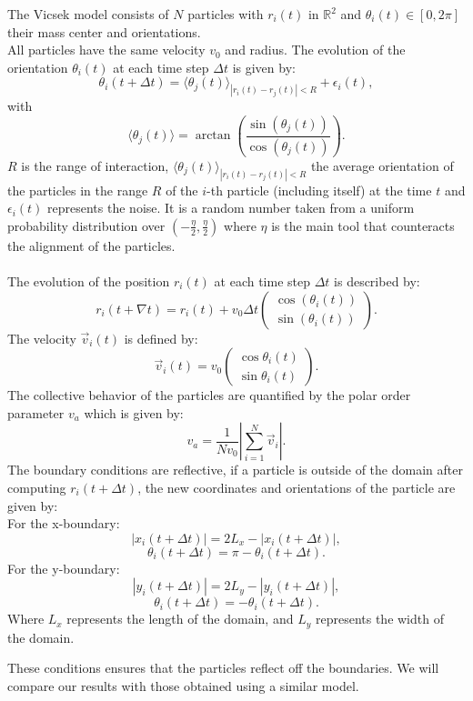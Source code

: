 \documentclass{article}
\begin{document}
The Vicsek model consists of $N$ particles with $r_i(t)$ in $\mathbb{R}^2$ and $\theta_i(t) \in \left[0, 2\pi\right]$ 
their mass center and orientations.\\
All particles have the same velocity $v_0$ and radius.
The evolution of the orientation $\theta_i(t)$ at each time step $\Delta t$ is given by:
$$\theta_i(t + \Delta t) = \langle\theta_j(t)\rangle_{|r_i(t) - r_j(t)| < R} + \epsilon_i(t),$$
with
$$\langle\theta_j(t)\rangle = \arctan\left(\frac{\sin(\theta_j(t))}{\cos(\theta_j(t))}\right).$$
$R$ is the range of interaction, $\langle\theta_j(t)\rangle_{|r_i(t) - r_j(t)| < R}$ the average 
orientation of the particles in the range $R$ of
 the $i$-th particle (including itself) at the time $t$ and $\epsilon_i(t)$ represents the noise. 
 It is a random number taken from a uniform probability distribution
over $\left(-\frac{\eta}{2}, \frac{\eta}{2}\right)$ where $\eta$ is the main tool that counteracts the alignment of the particles.\\
\\
The evolution of the position $r_i(t)$ at each time step $\Delta t$ is described by:
$$ r_i(t + \nabla t) = r_i(t) + v_0\Delta t \begin{pmatrix}
    \cos(\theta_i(t))\\
    \sin(\theta_i(t))
\end{pmatrix}.$$
The velocity $\vec{v}_i(t)$ is defined by:
$$\vec{v}_i(t) = v_0\begin{pmatrix}
    \cos\theta_i(t)\\
    \sin\theta_i(t)
\end{pmatrix}.$$
The collective behavior of the particles are quantified by the polar order parameter $v_a$ which is given by:
$$v_a = \frac{1}{Nv_0}\left|\sum^{N}_{i=1}\vec{v}_i\right|.$$
The boundary conditions are reflective, if a particle is outside of the domain after computing $r_i(t + \Delta t)$, the new 
coordinates and orientations of the particle are given by:\\
For the x-boundary:
$$|x_i(t + \Delta t)| = 2L_x - |x_i(t + \Delta t)|,$$
$$\theta_{i}(t + \Delta t) = \pi - \theta_i(t + \Delta t).$$
For the y-boundary:
$$|y_i(t + \Delta t)| = 2L_y - |y_i(t + \Delta t)|,$$
$$\theta_i(t + \Delta t) = -\theta_i(t + \Delta t).$$
Where $L_x$ represents the length of the domain, and $L_y$ represents the width of the domain.
\begin{center}
\end{center}
These conditions ensures that the particles reflect off the boundaries.
We will compare our results with those obtained using a similar model.
\end{document}
